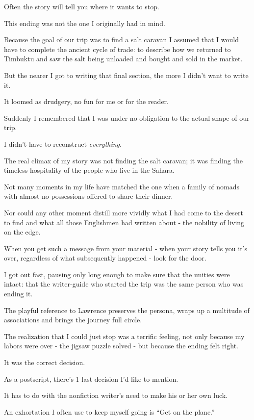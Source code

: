 \documentclass{book}
\numberwithin{equation}{section}
\begin{document}
Often the story will tell you where it wants to stop.

This ending was not the one I originally had in mind.

Because the goal of our trip was to find a salt caravan I assumed that I would have to complete the ancient cycle of trade: to describe how we returned to Timbuktu and saw the salt being unloaded and bought and sold in the market.

But the nearer I got to writing that final section, the more I didn't want to write it.

It loomed as drudgery, no fun for me or for the reader.

%
Suddenly I remembered that I was under no obligation to the actual shape of our trip.

I didn't have to reconstruct \textit{everything}.

The real climax of my story was not finding the salt caravan; it was finding the timeless hospitality of the people who live in the Sahara.

Not many moments in my life have matched the one when a family of nomads with almost no possessions offered to share their dinner.

Nor could any other moment distill more vividly what I had come to the desert to find and what all those Englishmen had written about - the nobility of living on the edge.

%
When you get such a message from your material - when your story tells you it's over, regardless of what subsequently happened - look for the door.

I got out fast, pausing only long enough to make sure that the unities were intact: that the writer-guide who started the trip was the same person who was ending it.

The playful reference to Lawrence preserves the persona, wraps up a multitude of associations and brings the journey full circle.

The realization that I could just stop was a terrific feeling, not only because my labors were over - the jigsaw puzzle solved - but because the ending felt right.

It was the correct decision.

%
As a postscript, there's 1 last decision I'd like to mention.

It has to do with the nonfiction writer's need to make his or her own luck.

An exhortation I often use to keep myself going is ``Get on the plane.''
\end{document}
